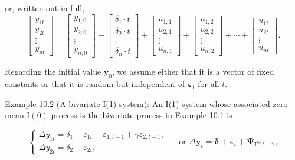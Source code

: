 \documentclass[10pt]{article}
\begin{document}
or, written out in full,
$$
\left[\begin{array}{c}
y_{1 t} \\
y_{2 t} \\
\vdots \\
y_{n t}
\end{array}\right]=\left[\begin{array}{c}
y_{1,0} \\
y_{2,0} \\
\vdots \\
y_{n, 0}
\end{array}\right]+\left[\begin{array}{c}
\delta_{1} \cdot t \\
\delta_{2} \cdot t \\
\vdots \\
\delta_{n} \cdot t
\end{array}\right]+\left[\begin{array}{c}
u_{1,1} \\
u_{2,1} \\
\vdots \\
u_{n, 1}
\end{array}\right]+\left[\begin{array}{c}
u_{1,2} \\
u_{2,2} \\
\vdots \\
u_{n, 2}
\end{array}\right]+\cdots+\left[\begin{array}{c}
u_{1 t} \\
u_{2 t} \\
\vdots \\
u_{n t}
\end{array}\right] .
$$

Regarding the initial value $\mathbf{y}_{0}$, we assume either that it is a vector of fixed constants or that it is random but independent of $\boldsymbol{\varepsilon}_{t}$ for all $t$.

Example 10.2 (A bivariate I(1) system): An I(1) system whose associated zero-mean $\mathrm{I}(0)$ process is the bivariate process in Example 10.1 is

\[
\left\{\begin{array}{l}
\Delta y_{1 t}=\delta_{1}+\varepsilon_{1 t}-\varepsilon_{1, t-1}+\gamma \varepsilon_{2, t-1},  \tag{10.1.12}\\
\Delta y_{2 t}=\delta_{2}+\varepsilon_{2 t},
\end{array} \quad \text { or } \Delta \mathbf{y}_{t}=\boldsymbol{\delta}+\boldsymbol{\varepsilon}_{t}+\boldsymbol{\Psi}_{\mathbf{I}} \boldsymbol{\varepsilon}_{t-\mathbf{1}},\right.
\]
\end{document}
